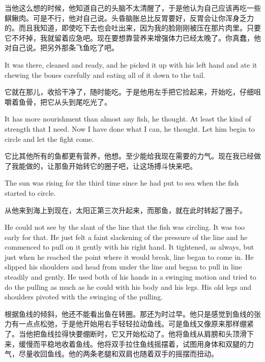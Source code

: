 \begin{paracol}{2}
\switchcolumn

当他这么想的时候，他知道自己的头脑不太清醒了，于是他认为自己应该再吃一些鲯鳅肉。可是不行，他对自己说。头昏脑胀总比反胃要好，反胃会让你浑身乏力的。而且我知道，即使吃下去也会吐出来，因为我的脸刚刚被压在那片肉里。只要它不坏掉，我就留着应急吧。现在要想靠营养来增强体力已经太晚了。你真蠢，他对自己说。把另外那条飞鱼吃了吧。

\switchcolumn*

It was there, cleaned and ready, and he picked it up with his left hand and
ate it chewing the bones carefully and eating all of it down to the tail.

\switchcolumn

它就在那儿，收拾干净了，随时能吃。于是他用左手把它捡起来，开始吃，仔细咀嚼着鱼骨，把它从头到尾吃光了。

\switchcolumn*

It has more nourishment than almost any fish, he thought. At least the kind
of strength that I need. Now I have done what I can, he thought. Let him
begin to circle and let the fight come.

\switchcolumn

它比其他所有的鱼都更有营养，他想。至少能给我现在需要的力气。现在我已经做了我能做的，让那鱼开始转它的圈子吧，让这场搏斗快来吧。

\switchcolumn*

The sun was rising for the third time since he had put to sea when the fish
started to circle.

\switchcolumn

从他来到海上到现在，太阳正第三次升起来，而那鱼，就在此时转起了圈子。

\switchcolumn*

He could not see by the slant of the line that the fish was circling. It was
too early for that. He just felt a faint \gls{slackening} of the pressure of
the line and he commenced to pull on it gently with his right hand. It
tightened, as always, but just when he reached the point where it would
break, line began to come in. He slipped his shoulders and head from under
the line and began to pull in line steadily and gently. He used both of his
hands in a swinging motion and tried to do the pulling as much as he could
with his body and his legs. His old legs and shoulders pivoted with the
swinging of the pulling.

\switchcolumn

根据鱼线的倾斜，他还不能看出鱼在转圈。那还为时过早。他只是感觉到鱼线的张力有一点点松弛，于是他开始用右手轻轻拉动鱼线。可是鱼线又像原来那样绷紧了。当他把鱼线拉得快要绷断时，它又开始松动了。他将鱼线从肩膀和头顶滑下来，缓慢而平稳地收着鱼线。他将双手拉住鱼线摇摆着，试图用身体和双腿的力气，尽量收回鱼线。他的两条老腿和双肩也随着双手的摇摆而扭动。


\end{paracol}
